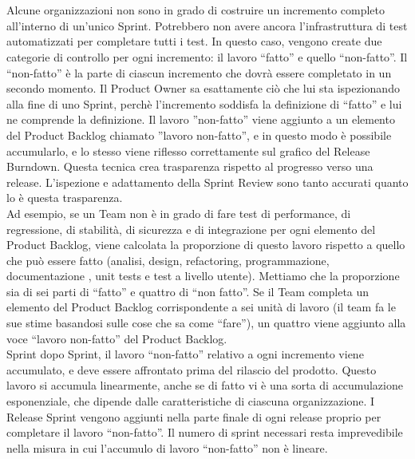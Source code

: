 \section*{\color{Blue}{CONSIDERAZIONI FINALI}}
\label{sec:finalthoughts}
Alcune organizzazioni non sono in grado di costruire un incremento completo all'interno di un'unico Sprint. Potrebbero non avere ancora l'infrastruttura  di test automatizzati per completare tutti i test. In questo caso,  vengono create due categorie di controllo per ogni incremento: il lavoro ``fatto'' e quello ``non-fatto''. Il ``non-fatto'' \`e la parte di ciascun incremento che dovr\`a essere completato in un secondo momento. Il Product Owner sa esattamente ci\`o che lui sta ispezionando alla fine di uno Sprint, perch\`e l'incremento soddisfa la definizione di ``fatto'' e lui ne comprende la definizione. Il lavoro ''non-fatto'' viene aggiunto a un elemento del Product Backlog chiamato ''lavoro non-fatto'', e in questo modo \`e possibile accumularlo, e lo stesso viene riflesso correttamente sul grafico del Release Burndown. Questa tecnica crea trasparenza rispetto al progresso verso una release. L'ispezione e adattamento della Sprint Review sono tanto accurati quanto lo \`e questa trasparenza.\\

Ad esempio, se un Team non \`e in grado di fare test di performance, di regressione, di stabilit\`a, di sicurezza e di integrazione per ogni elemento del Product Backlog, viene calcolata la proporzione di questo lavoro rispetto a quello che pu\`o essere fatto (analisi, design, refactoring, programmazione, documentazione , unit tests e test a livello utente). Mettiamo che la proporzione sia di sei parti di ``fatto'' e quattro di ``non fatto''. Se il Team completa un elemento del Product Backlog corrispondente a sei unit\`a di lavoro (il team fa le sue stime basandosi sulle cose che sa  come ``fare''), un quattro viene aggiunto alla voce ``lavoro non-fatto'' del Product Backlog.\\

Sprint dopo Sprint, il lavoro ``non-fatto'' relativo a  ogni incremento viene accumulato, e deve essere affrontato prima del rilascio del prodotto. Questo lavoro si accumula linearmente, anche se di fatto vi \`e una sorta di accumulazione esponenziale, che dipende dalle caratteristiche di ciascuna organizzazione. I Release Sprint vengono aggiunti nella parte finale di ogni release proprio per completare il lavoro ``non-fatto''.
Il numero di sprint necessari resta imprevedibile nella misura in cui l'accumulo di lavoro ``non-fatto'' non \`e  lineare. 
